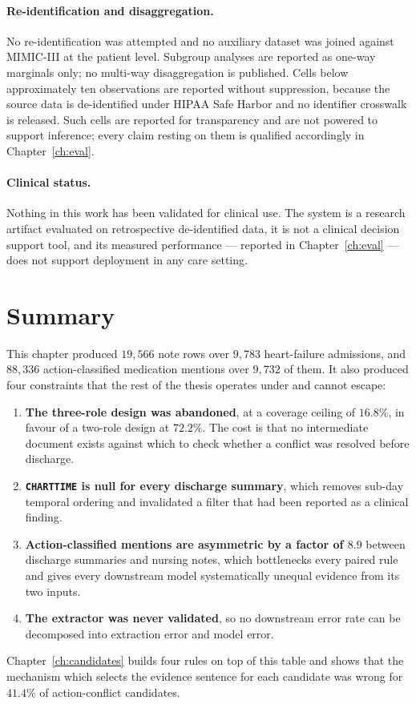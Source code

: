 \paragraph{Re-identification and disaggregation.} No re-identification was
attempted and no auxiliary dataset was joined against MIMIC-III at the patient
level. Subgroup analyses are reported as one-way marginals only; no multi-way
disaggregation is published. Cells below approximately ten observations are
reported without suppression, because the source data is de-identified under
HIPAA Safe Harbor and no identifier crosswalk is released. Such cells are
reported for transparency and are not powered to support inference; every claim
resting on them is qualified accordingly in Chapter~\ref{ch:eval}.

\paragraph{Clinical status.} Nothing in this work has been validated for
clinical use. The system is a research artifact evaluated on retrospective
de-identified data, it is not a clinical decision support tool, and its measured
performance --- reported in Chapter~\ref{ch:eval} --- does not support deployment
in any care setting.

\section{Summary}
\label{sec:data-summary}

This chapter produced $19{,}566$ note rows over $9{,}783$ heart-failure
admissions, and $88{,}336$ action-classified medication mentions over $9{,}732$
of them. It also produced four constraints that the rest of the thesis operates
under and cannot escape:

\begin{enumerate}
\item \textbf{The three-role design was abandoned}, at a coverage ceiling of
      $16.8\%$, in favour of a two-role design at $72.2\%$. The cost is that no
      intermediate document exists against which to check whether a conflict was
      resolved before discharge.
\item \textbf{\texttt{CHARTTIME} is null for every discharge summary}, which
      removes sub-day temporal ordering and invalidated a filter that had been
      reported as a clinical finding.
\item \textbf{Action-classified mentions are asymmetric by a factor of $8.9$}
      between discharge summaries and nursing notes, which bottlenecks every
      paired rule and gives every downstream model systematically unequal
      evidence from its two inputs.
\item \textbf{The extractor was never validated}, so no downstream error rate
      can be decomposed into extraction error and model error.
\end{enumerate}

Chapter~\ref{ch:candidates} builds four rules on top of this table and shows
that the mechanism which selects the evidence sentence for each candidate was
wrong for $41.4\%$ of action-conflict candidates.
